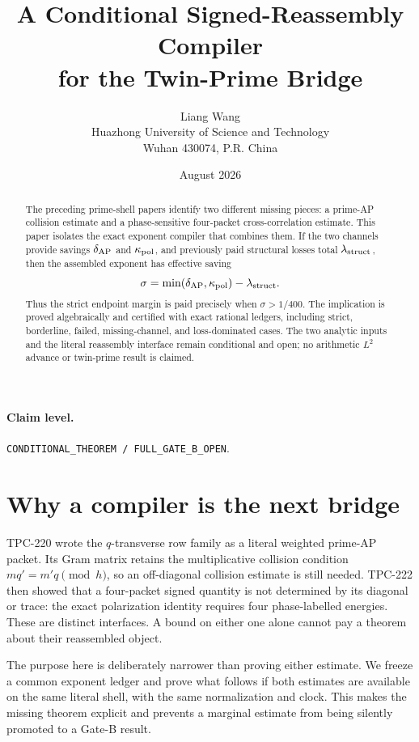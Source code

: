 \documentclass[11pt]{article}
\title{A Conditional Signed-Reassembly Compiler\\
  for the Twin-Prime Bridge}
\author{Liang Wang\\
  Huazhong University of Science and Technology\\
  Wuhan 430074, P.R. China}
\date{August 2026}
\begin{document}
\maketitle

\begin{abstract}
The preceding prime-shell papers identify two different missing pieces: a
prime-AP collision estimate and a phase-sensitive four-packet cross-correlation
estimate.  This paper isolates the exact exponent compiler that combines them.
If the two channels provide savings $\delta_{\rm AP}$ and $\kappa_{\rm pol}$,
and previously paid structural losses total $\lambda_{\rm struct}$, then the
assembled exponent has effective saving
\[
  \sigma=\min(\delta_{\rm AP},\kappa_{\rm pol})-\lambda_{\rm struct}.
\]
Thus the strict endpoint margin is paid precisely when
$\sigma>1/400$.  The implication is proved algebraically and certified with
exact rational ledgers, including strict, borderline, failed, missing-channel,
and loss-dominated cases.  The two analytic inputs and the literal reassembly
interface remain conditional and open; no arithmetic $L^2$ advance or twin-prime
result is claimed.
\end{abstract}

\paragraph{Claim level.}
\texttt{CONDITIONAL\_THEOREM / FULL\_GATE\_B\_OPEN}.

\section{Why a compiler is the next bridge}

TPC-220 wrote the $q$-transverse row family as a literal weighted prime-AP
packet.  Its Gram matrix retains the multiplicative collision condition
\(m q'=m' q\pmod h\), so an off-diagonal collision estimate is still needed.
TPC-222 then showed that a four-packet signed quantity is not determined by its
diagonal or trace: the exact polarization identity requires four phase-labelled
energies.  These are distinct interfaces.  A bound on either one alone cannot
pay a theorem about their reassembled object.

The purpose here is deliberately narrower than proving either estimate.  We
freeze a common exponent ledger and prove what follows if both estimates are
available on the same literal shell, with the same normalization and clock.
This makes the missing theorem explicit and prevents a marginal estimate from
being silently promoted to a Gate-B result.
\end{document}
